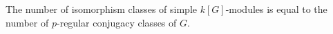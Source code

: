 The number of isomorphism classes of simple $k[G]$-modules is equal to the number of $p$-regular conjugacy classes of $G$.
